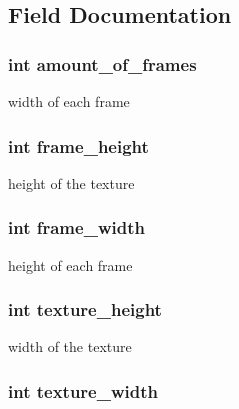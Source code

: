 \subsection{Field Documentation}
\hypertarget{struct___image_a2a2e85b75bd743d491247027f5ff7a21}{
\subsubsection[{amount\+\_\+of\+\_\+frames}]{\setlength{\rightskip}{0pt plus 5cm}int amount\+\_\+of\+\_\+frames}}\label{struct___image_a2a2e85b75bd743d491247027f5ff7a21}
width of each frame \hypertarget{struct___image_ac2614f43e36df461d5e4729be3ad04b4}{
\subsubsection[{frame\+\_\+height}]{\setlength{\rightskip}{0pt plus 5cm}int frame\+\_\+height}}\label{struct___image_ac2614f43e36df461d5e4729be3ad04b4}
height of the texture \hypertarget{struct___image_a4f1bbe063dc390226d56e9eb79afc663}{
\subsubsection[{frame\+\_\+width}]{\setlength{\rightskip}{0pt plus 5cm}int frame\+\_\+width}}\label{struct___image_a4f1bbe063dc390226d56e9eb79afc663}
height of each frame \hypertarget{struct___image_a22e910452b37a1bcd9b35c927236af20}{
\subsubsection[{texture\+\_\+height}]{\setlength{\rightskip}{0pt plus 5cm}int texture\+\_\+height}}\label{struct___image_a22e910452b37a1bcd9b35c927236af20}
width of the texture \hypertarget{struct___image_ae4f71de45f0a2263d14930dcf8691f5d}{
\subsubsection[{texture\+\_\+width}]{\setlength{\rightskip}{0pt plus 5cm}int texture\+\_\+width}}\label{struct___image_ae4f71de45f0a2263d14930dcf8691f5d}

